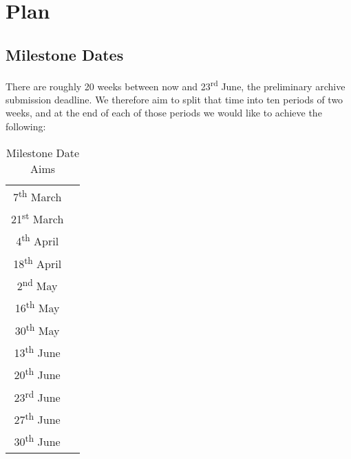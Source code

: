 \section{Plan}

\subsection{Milestone Dates}

There are roughly 20 weeks between now and 23\textsuperscript{rd} June, the preliminary archive submission deadline. We therefore aim to split that time into ten periods of two weeks, and at the end of each of those periods we would like to achieve the following:
    \begin{table}[h!]
        \centering
        \begin{tabular}{ c | c }
            7\textsuperscript{th} March &\\
            21\textsuperscript{st} March &\\
            4\textsuperscript{th} April &\\
            18\textsuperscript{th} April &\\
            2\textsuperscript{nd} May &\\
            16\textsuperscript{th} May &\\
            30\textsuperscript{th} May &\\
            13\textsuperscript{th} June &\\
            20\textsuperscript{th} June &\\
            23\textsuperscript{rd} June &\\
            27\textsuperscript{th} June &\\
            30\textsuperscript{th} June &
        \end{tabular}
        \caption{Milestone Date Aims}
        \label{table:milestone_aims}
    \end{table}
